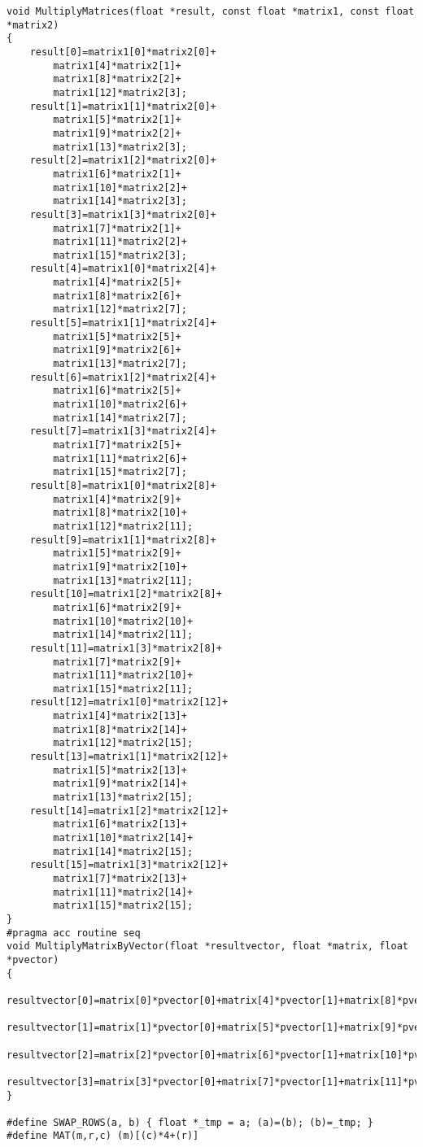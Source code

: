 \documentclass[]{article}
\begin{document}
\begin{Verbatim}[fontsize= \footnotesize, tabsize=4]
void MultiplyMatrices(float *result, const float *matrix1, const float *matrix2)
{
	result[0]=matrix1[0]*matrix2[0]+
		matrix1[4]*matrix2[1]+
		matrix1[8]*matrix2[2]+
		matrix1[12]*matrix2[3];
	result[1]=matrix1[1]*matrix2[0]+
		matrix1[5]*matrix2[1]+
		matrix1[9]*matrix2[2]+
		matrix1[13]*matrix2[3];
	result[2]=matrix1[2]*matrix2[0]+
		matrix1[6]*matrix2[1]+
		matrix1[10]*matrix2[2]+
		matrix1[14]*matrix2[3];
	result[3]=matrix1[3]*matrix2[0]+
		matrix1[7]*matrix2[1]+
		matrix1[11]*matrix2[2]+
		matrix1[15]*matrix2[3];
	result[4]=matrix1[0]*matrix2[4]+
		matrix1[4]*matrix2[5]+
		matrix1[8]*matrix2[6]+
		matrix1[12]*matrix2[7];
	result[5]=matrix1[1]*matrix2[4]+
		matrix1[5]*matrix2[5]+
		matrix1[9]*matrix2[6]+
		matrix1[13]*matrix2[7];
	result[6]=matrix1[2]*matrix2[4]+
		matrix1[6]*matrix2[5]+
		matrix1[10]*matrix2[6]+
		matrix1[14]*matrix2[7];
	result[7]=matrix1[3]*matrix2[4]+
		matrix1[7]*matrix2[5]+
		matrix1[11]*matrix2[6]+
		matrix1[15]*matrix2[7];
	result[8]=matrix1[0]*matrix2[8]+
		matrix1[4]*matrix2[9]+
		matrix1[8]*matrix2[10]+
		matrix1[12]*matrix2[11];
	result[9]=matrix1[1]*matrix2[8]+
		matrix1[5]*matrix2[9]+
		matrix1[9]*matrix2[10]+
		matrix1[13]*matrix2[11];
	result[10]=matrix1[2]*matrix2[8]+
		matrix1[6]*matrix2[9]+
		matrix1[10]*matrix2[10]+
		matrix1[14]*matrix2[11];
	result[11]=matrix1[3]*matrix2[8]+
		matrix1[7]*matrix2[9]+
		matrix1[11]*matrix2[10]+
		matrix1[15]*matrix2[11];
	result[12]=matrix1[0]*matrix2[12]+
		matrix1[4]*matrix2[13]+
		matrix1[8]*matrix2[14]+
		matrix1[12]*matrix2[15];
	result[13]=matrix1[1]*matrix2[12]+
		matrix1[5]*matrix2[13]+
		matrix1[9]*matrix2[14]+
		matrix1[13]*matrix2[15];
	result[14]=matrix1[2]*matrix2[12]+
		matrix1[6]*matrix2[13]+
		matrix1[10]*matrix2[14]+
		matrix1[14]*matrix2[15];
	result[15]=matrix1[3]*matrix2[12]+
		matrix1[7]*matrix2[13]+
		matrix1[11]*matrix2[14]+
		matrix1[15]*matrix2[15];
}
#pragma acc routine seq
void MultiplyMatrixByVector(float *resultvector, float *matrix, float *pvector)
{
	resultvector[0]=matrix[0]*pvector[0]+matrix[4]*pvector[1]+matrix[8]*pvector[2]+matrix[12]*pvector[3];
	resultvector[1]=matrix[1]*pvector[0]+matrix[5]*pvector[1]+matrix[9]*pvector[2]+matrix[13]*pvector[3];
	resultvector[2]=matrix[2]*pvector[0]+matrix[6]*pvector[1]+matrix[10]*pvector[2]+matrix[14]*pvector[3];
	resultvector[3]=matrix[3]*pvector[0]+matrix[7]*pvector[1]+matrix[11]*pvector[2]+matrix[15]*pvector[3];
}

#define SWAP_ROWS(a, b) { float *_tmp = a; (a)=(b); (b)=_tmp; }
#define MAT(m,r,c) (m)[(c)*4+(r)]


\end{Verbatim}
\end{document}
